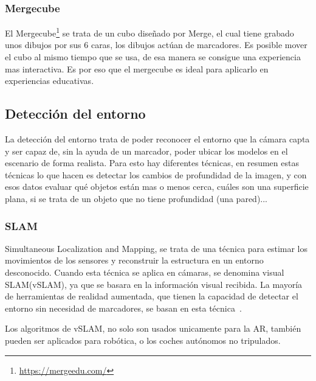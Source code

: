 	
	






	\subsubsection{Mergecube}\label{section:mergecube}
	
	El Mergecube\footnote{\url{https://mergeedu.com/}} se trata de un cubo diseñado por Merge, el cual tiene grabado unos dibujos por sus 6 caras, los dibujos actúan de marcadores. Es posible mover el cubo al mismo tiempo que se usa, de esa manera se consigue una experiencia mas interactiva. Es por eso que el mergecube es ideal para aplicarlo en experiencias educativas.
	
	
	\subsection{Detección del entorno}
	
	La detección del entorno trata de poder reconocer el entorno que la cámara capta y ser capaz de, sin la ayuda de un marcador, poder ubicar los modelos en el escenario de forma realista.
	Para esto hay diferentes técnicas, en resumen estas técnicas lo que hacen es detectar los cambios de profundidad de la imagen, y con esos datos evaluar qué objetos están mas o menos cerca, cuáles son una superficie plana, si se trata de un objeto que no tiene profundidad (una pared)...
	
	\subsubsection{SLAM}
	
	Simultaneous Localization and Mapping, se trata de una técnica para estimar los movimientos de los sensores y reconstruir la estructura en un entorno desconocido. Cuando esta técnica se aplica en cámaras, se denomina visual SLAM(vSLAM), ya que se basara en la información visual recibida.
	La mayoría de herramientas de realidad aumentada, que tienen la capacidad de detectar el entorno sin necesidad de marcadores, se basan en esta técnica~\cite{taketomi2017visual}.
	
	Los algoritmos de vSLAM, no solo son usados unicamente para la AR, también pueden ser aplicados para robótica, o los coches autónomos no tripulados.
	
	
	
